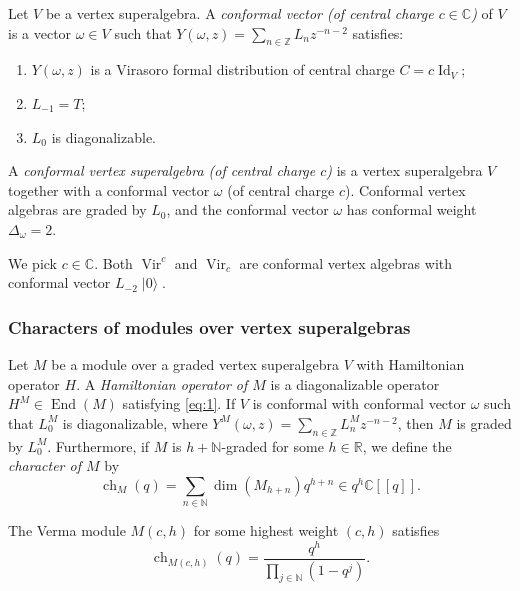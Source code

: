 \documentclass{beamer}
\DeclareMathOperator{\Vir}{Vir}
\DeclareMathOperator{\Id}{Id}
\DeclareMathOperator{\End}{End}
\DeclareMathOperator{\ch}{ch}
\DeclareMathOperator{\vac}{|0\rangle}
\begin{document}
\begin{frame}
  Let $V$ be a vertex superalgebra.
  A \emph{conformal vector (of central charge $c \in \mathbb{C}$)} of $V$ is a vector $\omega \in V$ such that $Y(\omega, z) = \sum_{n \in \mathbb{Z}}L_nz^{-n - 2}$ satisfies:
  \begin{enumerate}
  \item $Y(\omega, z)$ is a Virasoro formal distribution of central charge $C = c\Id_V$;
  \item $L_{-1} = T$;
  \item $L_0$ is diagonalizable.
  \end{enumerate}

  A \emph{conformal vertex superalgebra (of central charge $c$)} is a vertex superalgebra $V$ together with a conformal vector $\omega$ (of central charge $c$).
  Conformal vertex algebras are graded by $L_0$, and the conformal vector $\omega$ has conformal weight $\Delta_{\omega} = 2$.

  \begin{example}
    \label{exa:3}
    We pick $c \in \mathbb{C}$.
    Both $\Vir^c$ and $\Vir_c$ are conformal vertex algebras with conformal vector $L_{-2}\vac$.
  \end{example}
\end{frame}

\begin{frame}
  \frametitle{Characters of modules over vertex superalgebras}
  Let $M$ be a module over a graded vertex superalgebra $V$ with Hamiltonian operator $H$.
  A \emph{Hamiltonian operator of $M$} is a diagonalizable operator $H^M \in \End(M)$ satisfying \eqref{eq:1}.
  If $V$ is conformal with conformal vector $\omega$ such that $L_0^M$ is diagonalizable, where $Y^M(\omega, z) = \sum_{n \in \mathbb{Z}}L_n^Mz^{-n - 2}$, then $M$ is graded by $L_0^M$.
  Furthermore, if $M$ is $h + \mathbb{N}$-graded for some $h \in \mathbb{R}$, we define the \emph{character of $M$} by
  \begin{equation*}
    \ch_M(q) = \sum_{n \in \mathbb{N}}\dim(M_{h + n})q^{h + n} \in q^h\mathbb{C}[[q]].
  \end{equation*}

  \begin{example}
    \label{exa:4}
    The Verma module $M(c, h)$ for some highest weight $(c, h)$ satisfies
    \begin{equation*}
      \ch_{M(c, h)}(q) = \frac{q^h}{\prod_{j \in \mathbb{N}}(1 - q^j)}.
    \end{equation*}
  \end{example}
\end{frame}
\end{document}
